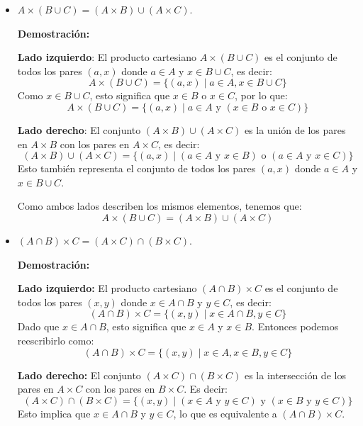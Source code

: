 \begin{solution}
    \begin{itemize}
        \item $A \times (B \cup C) = (A \times B) \cup (A \times C)$.

        \textbf{Demostración:}

        \textbf{Lado izquierdo}: El producto cartesiano \( A \times (B \cup C) \) es el conjunto de todos los pares \( (a, x) \) donde \( a \in A \) y \( x \in B \cup C \), es decir:
          \[
          A \times (B \cup C) = \{(a, x) \mid a \in A, x \in B \cup C\}
          \]
          Como \( x \in B \cup C \), esto significa que \( x \in B \) o \( x \in C \), por lo que:
          \[
          A \times (B \cup C) = \{(a, x) \mid a \in A \text{ y } (x \in B \text{ o } x \in C)\}
          \]
        
        \textbf{Lado derecho}: El conjunto \( (A \times B) \cup (A \times C) \) es la unión de los pares en \( A \times B \) con los pares en \( A \times C \), es decir:
          \[
          (A \times B) \cup (A \times C) = \{(a, x) \mid (a \in A \text{ y } x \in B) \text{ o } (a \in A \text{ y } x \in C)\}
          \]
          Esto también representa el conjunto de todos los pares \( (a, x) \) donde \( a \in A \) y \( x \in B \cup C \).
        
        Como ambos lados describen los mismos elementos, tenemos que:
        \[
        A \times (B \cup C) = (A \times B) \cup (A \times C)
        \]
        \item $(A \cap B) \times C = (A \times C) \cap (B \times C)$.

        \textbf{Demostración:}
        
        \textbf{Lado izquierdo:} El producto cartesiano \( (A \cap B) \times C \) es el conjunto de todos los pares \( (x, y) \) donde \( x \in A \cap B \) y \( y \in C \), es decir:
          \[
          (A \cap B) \times C = \{(x, y) \mid x \in A \cap B, y \in C\}
          \]
          Dado que \( x \in A \cap B \), esto significa que \( x \in A \) y \( x \in B \). Entonces podemos reescribirlo como:
          \[
          (A \cap B) \times C = \{(x, y) \mid x \in A, x \in B, y \in C\}
          \]
        
        \textbf{Lado derecho:} El conjunto \( (A \times C) \cap (B \times C) \) es la intersección de los pares en \( A \times C \) con los pares en \( B \times C \). Es decir:
          \[
          (A \times C) \cap (B \times C) = \{(x, y) \mid (x \in A \text{ y } y \in C) \text{ y } (x \in B \text{ y } y \in C)\}
          \]
          Esto implica que \( x \in A \cap B \) y \( y \in C \), lo que es equivalente a \( (A \cap B) \times C \).
        

\end{itemize}
\end{solution}
